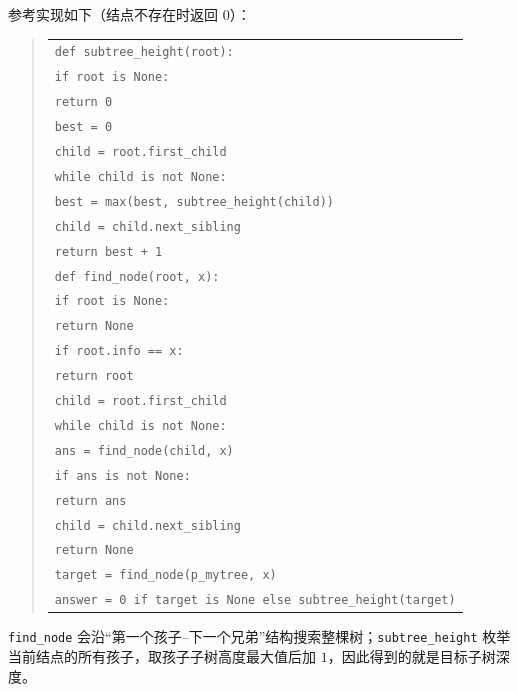 \begin{question}[求子树深度]
\begin{solution}
参考实现如下（结点不存在时返回 $0$）：
\begin{quote}
\footnotesize
\begin{tabular}{@{}l@{}}
\texttt{def subtree\_height(root):}\\
\texttt{\quad if root is None:}\\
\texttt{\quad\quad return 0}\\
\texttt{\quad best = 0}\\
\texttt{\quad child = root.first\_child}\\
\texttt{\quad while child is not None:}\\
\texttt{\quad\quad best = max(best, subtree\_height(child))}\\
\texttt{\quad\quad child = child.next\_sibling}\\
\texttt{\quad return best + 1}\\[0.35em]
\texttt{def find\_node(root, x):}\\
\texttt{\quad if root is None:}\\
\texttt{\quad\quad return None}\\
\texttt{\quad if root.info == x:}\\
\texttt{\quad\quad return root}\\
\texttt{\quad child = root.first\_child}\\
\texttt{\quad while child is not None:}\\
\texttt{\quad\quad ans = find\_node(child, x)}\\
\texttt{\quad\quad if ans is not None:}\\
\texttt{\quad\quad\quad return ans}\\
\texttt{\quad\quad child = child.next\_sibling}\\
\texttt{\quad return None}\\[0.35em]
\texttt{target = find\_node(p\_mytree, x)}\\
\texttt{answer = 0 if target is None else subtree\_height(target)}
\end{tabular}
\end{quote}
\texttt{find\_node} 会沿“第一个孩子--下一个兄弟”结构搜索整棵树；\texttt{subtree\_height} 枚举当前结点的所有孩子，取孩子子树高度最大值后加 $1$，因此得到的就是目标子树深度。
\end{solution}
\end{question}

\clearpage
